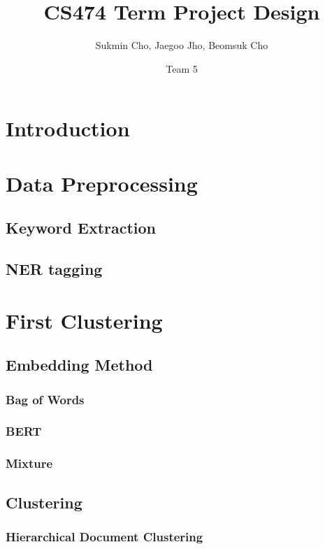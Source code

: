 \documentclass{article}
\title{CS474 Term Project Design}
\author{Sukmin Cho, Jaegoo Jho, Beomsuk Cho}
\date{Team 5}
\begin{document}
\maketitle

\section{Introduction}


\section{Data Preprocessing}

\subsection{Keyword Extraction}

\subsection{NER tagging}


\section{First Clustering}

\subsection{Embedding Method}

\subsubsection{Bag of Words}

\subsubsection{BERT}

\subsubsection{Mixture}

\subsection{Clustering}

\subsubsection{Hierarchical Document Clustering}

\end{document}

